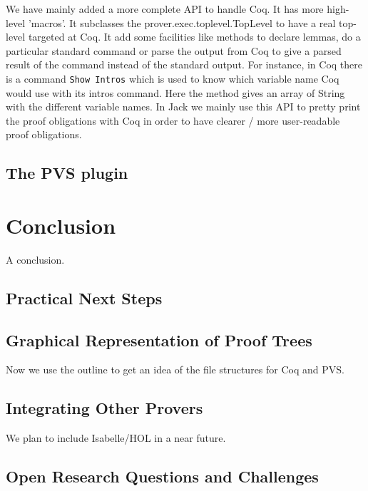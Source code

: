 \documentclass{entcs}
\begin{document}
We have mainly added a more complete API to handle Coq. It has more high-level
'macros'. It subclasses the prover.exec.toplevel.TopLevel to have a real top-level
targeted at Coq. It add some facilities like methods to declare lemmas, do a particular
standard command or parse the output from Coq to give a parsed result of the command
instead of the standard output. For instance, in Coq there is a command {\tt Show Intros} which
is used to know which variable name Coq would use with its  intros command. Here the
method gives an array of String with the different variable names.
In Jack we mainly use this API to pretty print the proof obligations with Coq in order
to have clearer / more user-readable proof obligations.

\subsection{The PVS plugin}
\section{Conclusion}

A conclusion.

\subsection{Practical Next Steps}

\subsection{Graphical Representation of Proof Trees}
Now we use the outline to get an idea of the file structures for Coq and PVS.

\subsection{Integrating Other Provers}
We plan to include Isabelle/HOL in a near future.
\subsection{Open Research Questions and Challenges}




%


\end{document}
